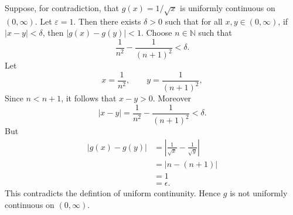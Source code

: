 \documentclass[12pt]{article}
\begin{document}
\begin{enumerate}[label=(\alph*)]
          Suppose, for contradiction, that \(g(x)=1/\sqrt{x}\) is uniformly continuous on \((0,\infty)\).
          Let \(\varepsilon=1\). Then there exists \(\delta>0\) such that for all \(x,y\in(0,\infty)\), if \(|x-y|<\delta\), then \(|g(x)-g(y)|<1\).
          Choose \( n \in \mathbb{N} \) such that
          \[
              \frac{1}{n^2} - \frac{1}{(n+1)^2} < \delta .
          \]
          Let
          \[
              x = \frac{1}{n^2}, \qquad y = \frac{1}{(n+1)^2},
          \]
          Since \( n < n+1 \), it follows that \( x - y > 0 \). Moreover
          \[
              \vert x - y \vert = \frac{1}{n^2} - \frac{1}{(n+1)^2} < \delta .
          \]
          But
          \[
              \begin{split}
                  \vert g(x) - g(y) \vert
                   & = \left\vert \frac{1}{\sqrt{x}} - \frac{1}{\sqrt{y}} \right\vert \\
                   & = \vert n - (n+1) \vert                                          \\
                   & = 1                                                              \\
                   & = \epsilon.
              \end{split}
          \]
          This contradicts the defintion of uniform continunity. Hence \( g \) is not uniformly continuous on \( (0, \infty ) \).








\end{enumerate}
\end{document}
